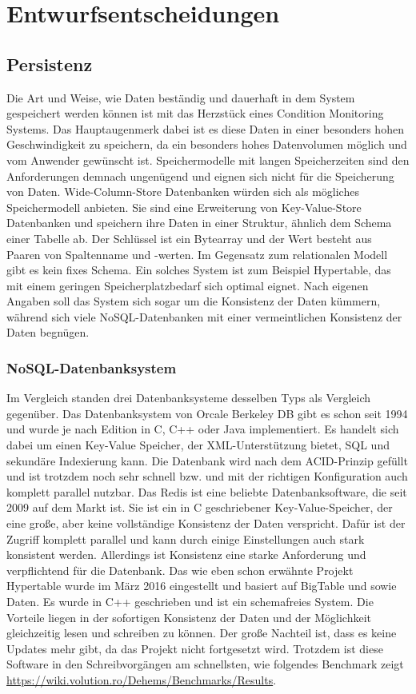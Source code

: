 \chapter{Entwurfsentscheidungen}
\section{Persistenz}
Die Art und Weise, wie Daten beständig und dauerhaft in dem System gespeichert werden können ist mit das Herzstück eines Condition Monitoring Systems. Das Hauptaugenmerk dabei ist es diese Daten in einer besonders hohen Geschwindigkeit zu speichern, da ein besonders hohes Datenvolumen möglich und vom Anwender gewünscht ist. Speichermodelle mit langen Speicherzeiten sind den Anforderungen demnach ungenügend und eignen sich nicht für die Speicherung von Daten. Wide-Column-Store Datenbanken würden sich als mögliches Speichermodell anbieten. Sie sind eine Erweiterung von Key-Value-Store Datenbanken und speichern ihre Daten in einer Struktur, ähnlich dem Schema einer Tabelle ab. Der Schlüssel ist ein Bytearray und der Wert besteht aus Paaren von Spaltenname und -werten. Im Gegensatz zum relationalen Modell gibt es kein fixes Schema. Ein solches System ist zum Beispiel Hypertable, das mit einem geringen Speicherplatzbedarf sich optimal eignet. Nach eigenen Angaben soll das System sich sogar um die Konsistenz der Daten kümmern, während sich viele NoSQL-Datenbanken mit einer vermeintlichen Konsistenz der Daten begnügen.
\subsection{NoSQL-Datenbanksystem}
Im Vergleich standen drei Datenbanksysteme desselben Typs als Vergleich gegenüber. Das Datenbanksystem von Orcale Berkeley DB gibt es schon seit 1994 und wurde je nach Edition in C, C++ oder Java implementiert. Es handelt sich dabei um einen Key-Value Speicher, der XML-Unterstützung bietet, SQL und sekundäre Indexierung kann. Die Datenbank wird nach dem ACID-Prinzip gefüllt und ist trotzdem noch sehr schnell bzw. und mit der richtigen Konfiguration auch komplett parallel nutzbar.
Das Redis ist eine beliebte Datenbanksoftware, die seit 2009 auf dem Markt ist. Sie ist ein in C geschriebener Key-Value-Speicher, der eine große, aber keine vollständige Konsistenz der Daten verspricht. Dafür ist der Zugriff komplett parallel und kann durch einige Einstellungen auch stark konsistent werden. Allerdings ist Konsistenz eine starke Anforderung und verpflichtend für die Datenbank. Das wie eben schon erwähnte Projekt Hypertable wurde im März 2016 eingestellt und basiert auf BigTable und sowie Daten. Es wurde in C++ geschrieben und ist ein schemafreies System. Die Vorteile liegen in der sofortigen Konsistenz der Daten und der Möglichkeit gleichzeitig lesen und schreiben zu können. Der große Nachteil ist, dass es keine Updates mehr gibt, da das Projekt nicht fortgesetzt wird. Trotzdem ist diese Software in den Schreibvorgängen am schnellsten, wie folgendes Benchmark zeigt \url{https://wiki.volution.ro/Dehems/Benchmarks/Results}.
